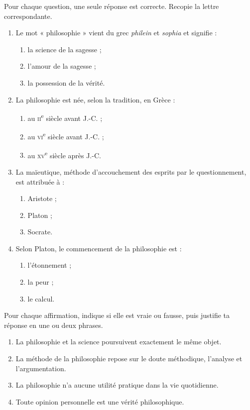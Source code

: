 \documentclass[11pt]{article}
\begin{document}
\begin{exercice}
Pour chaque question, une seule réponse est correcte. Recopie la lettre correspondante.
\begin{enumerate}
\item Le mot « philosophie » vient du grec \emph{philein} et \emph{sophia} et signifie :
\begin{enumerate}
\item la science de la sagesse ;
\item l'amour de la sagesse ;
\item la possession de la vérité.
\end{enumerate}
\item La philosophie est née, selon la tradition, en Grèce :
\begin{enumerate}
\item au \textsc{ii}\textsuperscript{e} siècle avant J.-C. ;
\item au \textsc{vi}\textsuperscript{e} siècle avant J.-C. ;
\item au \textsc{xv}\textsuperscript{e} siècle après J.-C.
\end{enumerate}
\item La maïeutique, méthode d'accouchement des esprits par le questionnement, est attribuée à :
\begin{enumerate}
\item Aristote ;
\item Platon ;
\item Socrate.
\end{enumerate}
\item Selon Platon, le commencement de la philosophie est :
\begin{enumerate}
\item l'étonnement ;
\item la peur ;
\item le calcul.
\end{enumerate}
\end{enumerate}
\end{exercice}

\begin{exercice}
Pour chaque affirmation, indique si elle est vraie ou fausse, puis justifie ta réponse en une ou deux phrases.
\begin{enumerate}
\item La philosophie et la science poursuivent exactement le même objet.
\item La méthode de la philosophie repose sur le doute méthodique, l'analyse et l'argumentation.
\item La philosophie n'a aucune utilité pratique dans la vie quotidienne.
\item Toute opinion personnelle est une vérité philosophique.
\end{enumerate}
\end{exercice}
\end{document}
